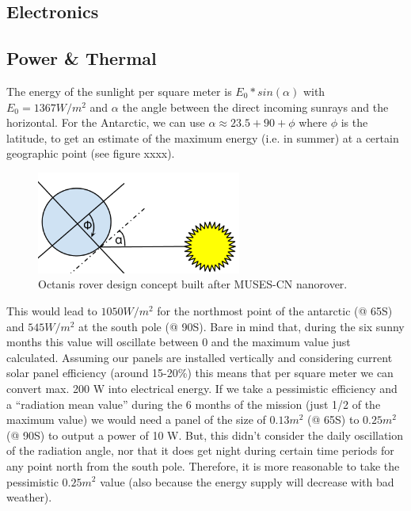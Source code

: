 \documentclass[a4paper,12pt]{article}
\begin{document}
\subsection{Electronics}


\subsection{Power \& Thermal}

The energy of the sunlight per square meter is $E_0*sin(\alpha)$ with $E_0=1367 W/m^2$ and $\alpha$ the angle between the direct incoming sunrays and the horizontal. For the Antarctic, we can use $\alpha \approx 23.5+90+\phi$ where $\phi$ is the latitude, to get an estimate of the maximum energy (i.e. in summer) at a certain geographic point (see figure xxxx).


\begin{figure}[h!]
	\centering
    \includegraphics[width=0.6\textwidth]{sun}
    \caption{Octanis rover design concept built after MUSES-CN nanorover.}
\end{figure}


 This would lead to $1050 W/m^2$ for the northmost point of the antarctic (@ 65\degree S) and $545 W/m^2$ at the south pole (@ 90\degree S). Bare in mind that, during the six sunny months this value will oscillate between 0 and the maximum value just calculated.
Assuming our panels are installed vertically and considering current solar panel efficiency (around 15-20\%) this means that per square meter we can convert max. 200 W into electrical energy. If we take a pessimistic efficiency and a “radiation mean value” during the 6 months of the mission (just 1/2 of the maximum value) we would need a panel of the size of $0.13m^2$ (@ 65\degree S) to $0.25m^2$ (@ 90\degree S) to output a power of 10 W. But, this didn’t consider the daily oscillation of the radiation angle, nor that it does get night during certain time periods for any point north from the south pole. Therefore, it is more reasonable to take the pessimistic $0.25m^2$ value (also because the energy supply will decrease with bad weather).
\end{document}
